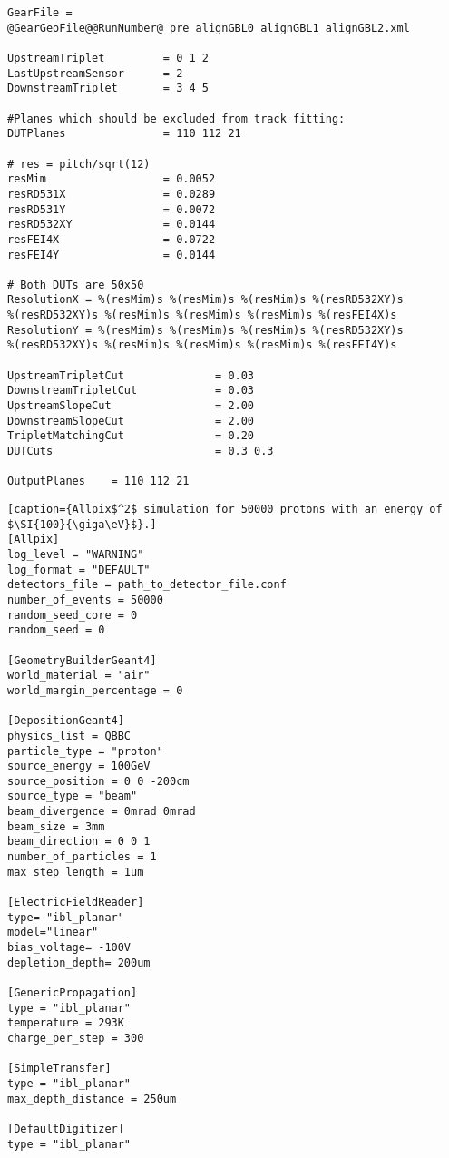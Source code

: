 \begin{lstlisting}[caption={Configuration file of EUTelescope for the testbeam analysis of June 2020 Batch 3.}]
GearFile = @GearGeoFile@@RunNumber@_pre_alignGBL0_alignGBL1_alignGBL2.xml

UpstreamTriplet         = 0 1 2
LastUpstreamSensor      = 2
DownstreamTriplet       = 3 4 5

#Planes which should be excluded from track fitting:
DUTPlanes               = 110 112 21

# res = pitch/sqrt(12)
resMim                  = 0.0052
resRD531X               = 0.0289
resRD531Y               = 0.0072
resRD532XY              = 0.0144
resFEI4X                = 0.0722
resFEI4Y                = 0.0144

# Both DUTs are 50x50
ResolutionX = %(resMim)s %(resMim)s %(resMim)s %(resRD532XY)s
%(resRD532XY)s %(resMim)s %(resMim)s %(resMim)s %(resFEI4X)s
ResolutionY = %(resMim)s %(resMim)s %(resMim)s %(resRD532XY)s
%(resRD532XY)s %(resMim)s %(resMim)s %(resMim)s %(resFEI4Y)s

UpstreamTripletCut              = 0.03
DownstreamTripletCut            = 0.03
UpstreamSlopeCut                = 2.00
DownstreamSlopeCut              = 2.00
TripletMatchingCut              = 0.20
DUTCuts                         = 0.3 0.3

OutputPlanes    = 110 112 21
\end{lstlisting}

\clearpage

\begin{lstlisting}[caption={Allpix$^2$ simulation for 50000 protons with an energy of $\SI{100}{\giga\eV}$}.]
[Allpix]
log_level = "WARNING"
log_format = "DEFAULT"
detectors_file = path_to_detector_file.conf
number_of_events = 50000
random_seed_core = 0
random_seed = 0

[GeometryBuilderGeant4]
world_material = "air"
world_margin_percentage = 0

[DepositionGeant4]
physics_list = QBBC
particle_type = "proton"
source_energy = 100GeV
source_position = 0 0 -200cm
source_type = "beam"
beam_divergence = 0mrad 0mrad
beam_size = 3mm
beam_direction = 0 0 1
number_of_particles = 1
max_step_length = 1um

[ElectricFieldReader]
type= "ibl_planar"
model="linear"
bias_voltage= -100V
depletion_depth= 200um

[GenericPropagation]
type = "ibl_planar"
temperature = 293K
charge_per_step = 300

[SimpleTransfer]
type = "ibl_planar"
max_depth_distance = 250um

[DefaultDigitizer]
type = "ibl_planar"
\end{lstlisting}

